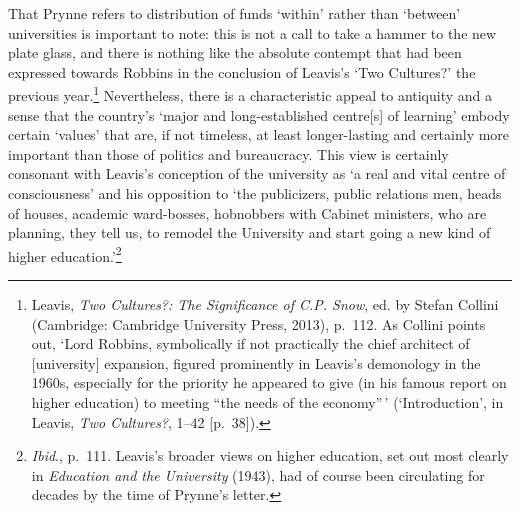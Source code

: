 \documentclass[]{article}
\begin{document}
\noindent That Prynne refers to distribution of funds `within' rather
than `between' universities is important to note: this is not a call to
take a hammer to the new plate glass, and there is nothing like the
absolute contempt that had been expressed towards Robbins in the
conclusion of Leavis's `Two Cultures?' the previous year.\footnote{Leavis,
  \emph{Two Cultures?: The Significance of C.P. Snow}, ed. by Stefan
  Collini (Cambridge: Cambridge University Press, 2013), p.~112. As
  Collini points out, `Lord Robbins, symbolically if not practically the
  chief architect of {[}university{]} expansion, figured prominently in
  Leavis's demonology in the 1960s, especially for the priority he
  appeared to give (in his famous report on higher education) to meeting
  ``the needs of the economy''\,' (`Introduction', in Leavis, \emph{Two
  Cultures?}, 1--42 {[}p.~38{]}).} Nevertheless, there is a
characteristic appeal to antiquity and a sense that the country's `major
and long-established centre{[}s{]} of learning' embody certain `values'
that are, if not timeless, at least longer-lasting and certainly more
important than those of politics and bureaucracy. This view is certainly
consonant with Leavis's conception of the university as `a real and
vital centre of consciousness' and his opposition to `the publicizers,
public relations men, heads of houses, academic ward-bosses, hobnobbers
with Cabinet ministers, who are planning, they tell us, to remodel the
University and start going a new kind of higher education.'\footnote{\emph{Ibid}.,
  p.~111. Leavis's broader views on higher education, set out most
  clearly in \emph{Education and the University} (1943), had of course
  been circulating for decades by the time of Prynne's letter.}
\end{document}
